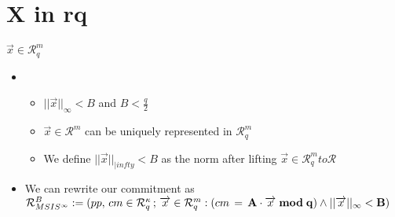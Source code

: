 \section{X in rq}
\begin{frame}{$\overrightarrow{x} \in \mathcal{R}^\mathit{m}_\mathit{q}$}
    \begin{itemize}
        \item  \begin{itemize}
                  \item $||\overrightarrow{x}||_{\infty} < B$ and $B < \frac{q}{2}$
                  \item $\overrightarrow{x} \in \mathcal{R}^m$ can be uniquely represented in $\mathcal{R}^m_q$
                  \item We define $||\overrightarrow{x}||_{|infty} < B$ as the norm after lifting $\overrightarrow{x} \in \mathcal{R}^m_q to \mathcal{R}$
              \end{itemize}
        \item We can rewrite our commitment as $\mathcal{R}^B_{MSIS^{\infty}} := {(pp, \, cm \in \mathcal{R}^{\kappa}_q\, ;\, \overrightarrow{x} \in \mathcal{R}^m_q : (cm\, =\, \bf{A}\cdot \overrightarrow{x} \; mod \; q) \land ||\overrightarrow{x}||_{\infty} < B  )}$
    \end{itemize}


\end{frame}